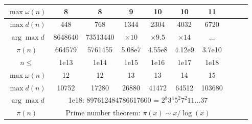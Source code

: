 \begin{table}[H]
\begin{tabular}{|c|c|c|c|c|c|c|c|c|c|}
			\hline
			$\max\omega(n)$ & 8 & 8 & 9 & 10& 10 & 11 \\
			\hline
			$\max{d(n)}$ & 448 & 768 & 1344 & 2304 & 4032 & 6720 \\
			\hline
			$\arg\max d$ & 8648640 & 73513440 & $\times 10$ & $\times 9.5$ & $\times 14$ & ... \\
			\hline
			$\pi(n)$ & 664579 & 5761455 & 5.08e7 & 4.55e8 & 4.12e9 & 3.7e10 \\
			\hline
			\rowcolor{black!10} $n \leq$ & 1e13& 1e14& 1e15& 1e16& 1e17& 1e18 \\
			\hline
			$\max\omega(n)$ & 12 & 12 & 13 & 13 & 14 & 15 \\
			\hline
			$\max{d(n)}$ & 10752 & 17280 & 26880 & 41472 & 64512 & 103680\\
			\hline
			$\arg\max d$ & \multicolumn{6}{c|}{1e18: 897612484786617600 = $2^{8} 3^{4} 5^2 7 ^ 2 11 \dots 37$} \\
			\hline
			$\pi(n)$ & \multicolumn{6}{c|}{Prime number theorem: $\pi(x) \sim x / \log (x)$} \\
			\hline
			\end{tabular}

	\end{table}